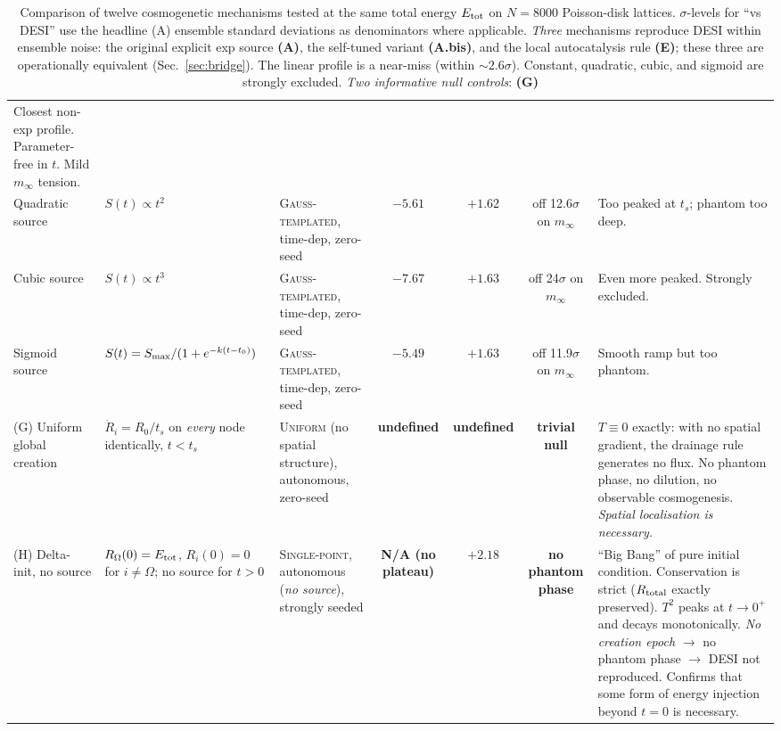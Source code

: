 \documentclass[11pt,a4paper]{article}
\begin{document}
\begin{table}[!htbp]
\begin{tabular}{p{2.2cm}p{3.0cm}p{2.4cm}cccp{3.0cm}}
Closest non-exp profile. Parameter-free in $t$. Mild $m_\infty$ tension. \\
\addlinespace
Quadratic source &
$S(t) \propto t^2$ &
\textsc{Gauss-templated}, time-dep, zero-seed &
$-5.61$ & $+1.62$ & off 12.6$\sigma$ on $m_\infty$ &
Too peaked at $t_s$; phantom too deep. \\
\addlinespace
Cubic source &
$S(t) \propto t^3$ &
\textsc{Gauss-templated}, time-dep, zero-seed &
$-7.67$ & $+1.63$ & off 24$\sigma$ on $m_\infty$ &
Even more peaked. Strongly excluded. \\
\addlinespace
Sigmoid source &
$S(t) = S_{\rm max}/(1+e^{-k(t-t_0)})$ &
\textsc{Gauss-templated}, time-dep, zero-seed &
$-5.49$ & $+1.63$ & off 11.9$\sigma$ on $m_\infty$ &
Smooth ramp but too phantom. \\
\addlinespace
(G) Uniform global creation &
$\dot R_i = R_0 / t_s$ on \emph{every} node identically, $t < t_s$ &
\textsc{Uniform} (no spatial structure), autonomous, zero-seed &
\textbf{undefined} & \textbf{undefined} & \textbf{trivial null} &
$T \equiv 0$ exactly: with no spatial gradient, the drainage rule
generates no flux. No phantom phase, no dilution, no observable
cosmogenesis. \emph{Spatial localisation is necessary.} \\
\addlinespace
(H) Delta-init, no source &
$R_\Omega(0) = E_{\rm tot}$, $R_i(0) = 0$ for $i \neq \Omega$;
no source for $t > 0$ &
\textsc{Single-point}, autonomous (\emph{no source}), strongly seeded &
\textbf{N/A (no plateau)} & $+2.18$ & \textbf{no phantom phase} &
``Big Bang'' of pure initial condition. Conservation is strict
($R_{\rm total}$ exactly preserved). $T^2$ peaks at $t \to 0^+$
and decays monotonically. \emph{No creation epoch} $\to$ no
phantom phase $\to$ DESI not reproduced. Confirms that some form
of energy injection beyond $t = 0$ is necessary. \\
\bottomrule
\end{tabular}
\caption{Comparison of twelve cosmogenetic mechanisms tested at the
same total energy $E_{\rm tot}$ on $N=8000$ Poisson-disk lattices.
$\sigma$-levels for ``vs DESI'' use the headline (A) ensemble standard
deviations as denominators where applicable. \emph{Three} mechanisms
reproduce DESI within ensemble noise: the original explicit exp source
\textbf{(A)}, the self-tuned variant \textbf{(A.bis)}, and the local
autocatalysis rule \textbf{(E)}; these three are operationally
equivalent (Sec.~\ref{sec:bridge}). The linear profile is a near-miss
(within $\sim 2.6\sigma$). Constant, quadratic, cubic, and sigmoid are
strongly excluded. \emph{Two informative null controls}: \textbf{(G)
}}
\end{table}
\end{document}
